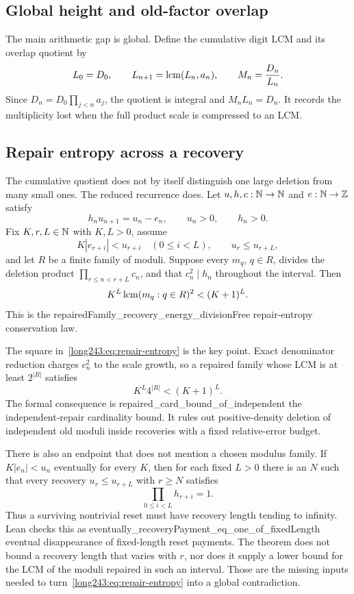 \documentclass[11pt]{article}
\begin{document}
\subsection{Global height and old-factor overlap}

The main arithmetic gap is global.  Define the cumulative digit LCM and its
overlap quotient by
\[
 L_0=D_0,\qquad L_{n+1}=\operatorname{lcm}(L_n,a_n),\qquad M_n=\frac{D_n}{L_n}.
\]
Since $D_n=D_0\prod_{j<n}a_j$, the quotient is integral and
$M_nL_n=D_n$.  It records the multiplicity lost when the full product scale
is compressed to an LCM.

\subsection{Repair entropy across a recovery}

The cumulative quotient does not by itself distinguish one large deletion
from many small ones.  The reduced recurrence does.  Let $u,h,c:\mathbb{N}\to\mathbb{N}$ and
$e:\mathbb{N}\to\mathbb{Z}$ satisfy
\[
 h_nu_{n+1}=u_n-e_n,
 \qquad u_n>0,
 \qquad h_n>0.
\]
Fix $K,r,L\in\mathbb{N}$ with $K,L>0$, assume
\[
 K|e_{r+i}|<u_{r+i}\quad(0\le i<L),
 \qquad u_r\le u_{r+L},
\]
and let $R$ be a finite family of moduli.  Suppose every $m_q$, $q\in R$,
divides the deletion product $\prod_{r\le n<r+L}c_n$, and that
$c_n^2\mid h_n$ throughout the interval.  Then
\begin{equation}\label{long243:eq:repair-entropy}
 K^L\operatorname{lcm}(m_q:q\in R)^2<(K+1)^L.
\end{equation}
This is the
      {repairedFamily_recovery_energy_divisionFree}
      {repair-entropy conservation law}.

The square in~\eqref{long243:eq:repair-entropy} is the key point.  Exact denominator
reduction charges $c_n^2$ to the scale growth, so a repaired family whose LCM
is at least $2^{|R|}$ satisfies
\[
 K^L4^{|R|}<(K+1)^L.
\]
The formal consequence is
      {repaired_card_bound_of_independent}
      {the independent-repair cardinality bound}.
It rules out positive-density deletion of independent old moduli inside
recoveries with a fixed relative-error budget.

There is also an endpoint that does not mention a chosen modulus family.  If
$K|e_n|<u_n$ eventually for every $K$, then for each fixed $L>0$ there is an
$N$ such that every recovery $u_r\le u_{r+L}$ with $r\ge N$ satisfies
\[
 \prod_{0\le i<L}h_{r+i}=1.
\]
Thus a surviving nontrivial reset must have recovery length tending to
infinity.  Lean checks this as
      {eventually_recoveryPayment_eq_one_of_fixedLength}
      {eventual disappearance of fixed-length reset payments}.
The theorem does not bound a recovery length that varies with $r$, nor does it
supply a lower bound for the LCM of the moduli repaired in such an interval.
Those are the missing inputs needed to turn~\eqref{long243:eq:repair-entropy} into a
global contradiction.
\end{document}
